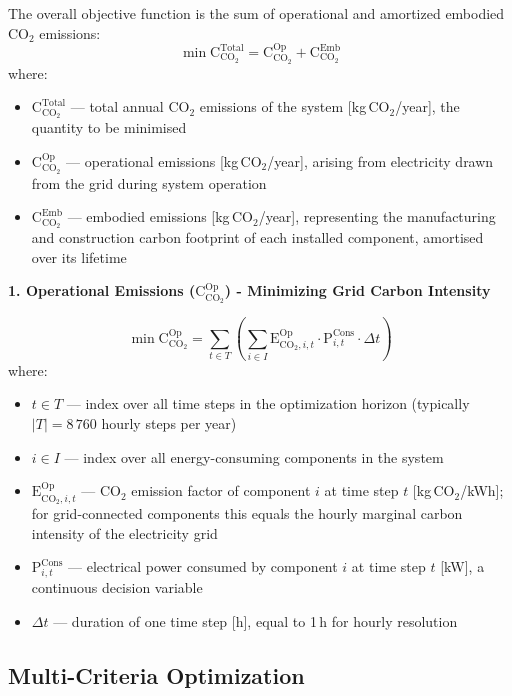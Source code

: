 \documentclass[11pt,a4paper]{report}
\begin{document}
The overall objective function is the sum of operational and amortized embodied $\text{CO}_2$ emissions:
$$
\min \text{C}_{\text{CO}_2}^{\text{Total}} = \text{C}_{\text{CO}_2}^{\text{Op}} + \text{C}_{\text{CO}_2}^{\text{Emb}}
$$
\noindent where:
\begin{itemize}
    \item $\text{C}_{\text{CO}_2}^{\text{Total}}$ --- total annual $\text{CO}_2$ emissions of the system [kg\,CO$_2$/year], the quantity to be minimised
    \item $\text{C}_{\text{CO}_2}^{\text{Op}}$ --- operational emissions [kg\,CO$_2$/year], arising from electricity drawn from the grid during system operation
    \item $\text{C}_{\text{CO}_2}^{\text{Emb}}$ --- embodied emissions [kg\,CO$_2$/year], representing the manufacturing and construction carbon footprint of each installed component, amortised over its lifetime
\end{itemize}

\textbf{1. Operational Emissions ($\text{C}_{\text{CO}_2}^{\text{Op}}$) - Minimizing Grid Carbon Intensity}

\begin{equation}
\min \text{C}_{\text{CO}_2}^{\text{Op}} = \sum_{t \in T} \left( \sum_{i \in I} \text{E}_{\text{CO}_2,i,t}^{\text{Op}} \cdot \text{P}_{i,t}^{\text{Cons}} \cdot \Delta t \right)
\end{equation}
\noindent where:
\begin{itemize}
    \item $t \in T$ --- index over all time steps in the optimization horizon (typically $|T| = 8\,760$ hourly steps per year)
    \item $i \in I$ --- index over all energy-consuming components in the system
    \item $\text{E}_{\text{CO}_2,i,t}^{\text{Op}}$ --- $\text{CO}_2$ emission factor of component $i$ at time step $t$ [kg\,CO$_2$/kWh]; for grid-connected components this equals the hourly marginal carbon intensity of the electricity grid
    \item $\text{P}_{i,t}^{\text{Cons}}$ --- electrical power consumed by component $i$ at time step $t$ [kW], a continuous decision variable
    \item $\Delta t$ --- duration of one time step [h], equal to 1\,h for hourly resolution
\end{itemize}

\subsection*{Multi-Criteria Optimization}
\end{document}
